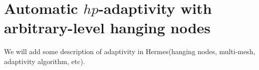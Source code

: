 \section{Automatic $hp$-adaptivity with arbitrary-level hanging nodes}
\label{sec:hp-adaptivity}

We will add some description of adaptivity 
in Hermes(hanging nodes, multi-mesh, adaptivity algorithm, etc).


